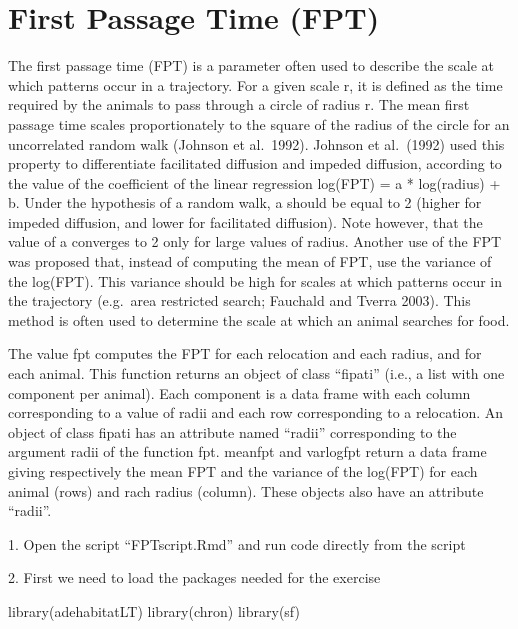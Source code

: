 \documentclass[
  letterpaper,
]{book}
\newenvironment{Shaded}{\begin{snugshade}}{\end{snugshade}}
\newcommand{\FunctionTok}[1]{\textcolor[rgb]{0.28,0.35,0.67}{#1}}
\newcommand{\NormalTok}[1]{\textcolor[rgb]{0.00,0.23,0.31}{#1}}
\begin{document}
\hypertarget{first-passage-time-fpt}{%
\chapter{First Passage Time (FPT)}\label{first-passage-time-fpt}}

The first passage time (FPT) is a parameter often used to describe the
scale at which patterns occur in a trajectory. For a given scale r, it
is defined as the time required by the animals to pass through a circle
of radius r. The mean first passage time scales proportionately to the
square of the radius of the circle for an uncorrelated random walk
(Johnson et al.~1992). Johnson et al.~(1992) used this property to
differentiate facilitated diffusion and impeded diffusion, according to
the value of the coefficient of the linear regression log(FPT) = a *
log(radius) + b. Under the hypothesis of a random walk, a should be
equal to 2 (higher for impeded diffusion, and lower for facilitated
diffusion). Note however, that the value of a converges to 2 only for
large values of radius. Another use of the FPT was proposed that,
instead of computing the mean of FPT, use the variance of the log(FPT).
This variance should be high for scales at which patterns occur in the
trajectory (e.g.~area restricted search; Fauchald and Tverra 2003). This
method is often used to determine the scale at which an animal searches
for food.

The value fpt computes the FPT for each relocation and each radius, and
for each animal. This function returns an object of class ``fipati''
(i.e., a list with one component per animal). Each component is a data
frame with each column corresponding to a value of radii and each row
corresponding to a relocation. An object of class fipati has an
attribute named ``radii'' corresponding to the argument radii of the
function fpt. meanfpt and varlogfpt return a data frame giving
respectively the mean FPT and the variance of the log(FPT) for each
animal (rows) and rach radius (column). These objects also have an
attribute ``radii''.

1. Open the script ``FPTscript.Rmd'' and run code directly from the
script

2. First we need to load the packages needed for the exercise

\begin{Shaded}
\begin{Highlighting}[]
\FunctionTok{library}\NormalTok{(adehabitatLT)}
\FunctionTok{library}\NormalTok{(chron)}
\FunctionTok{library}\NormalTok{(sf)}
\end{Highlighting}
\end{Shaded}
\end{document}
